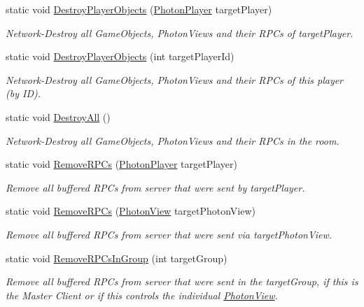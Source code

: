 \begin{DoxyCompactItemize}
static void \hyperlink{class_photon_network_a4c8c84b764c759a16296a1f3ebe48c46}{Destroy\+Player\+Objects} (\hyperlink{class_photon_player}{Photon\+Player} target\+Player)
\begin{DoxyCompactList}\small\item\em Network-\/\+Destroy all Game\+Objects, Photon\+Views and their R\+P\+Cs of target\+Player. \end{DoxyCompactList}\item 
static void \hyperlink{class_photon_network_aa3e39af39baae3611730b914a8fe6f8b}{Destroy\+Player\+Objects} (int target\+Player\+Id)
\begin{DoxyCompactList}\small\item\em Network-\/\+Destroy all Game\+Objects, Photon\+Views and their R\+P\+Cs of this player (by ID). \end{DoxyCompactList}\item 
static void \hyperlink{class_photon_network_a3b52beccf64860705cc467d7abf9fc41}{Destroy\+All} ()
\begin{DoxyCompactList}\small\item\em Network-\/\+Destroy all Game\+Objects, Photon\+Views and their R\+P\+Cs in the room. \end{DoxyCompactList}\item 
static void \hyperlink{class_photon_network_a0b99a01696f62ff29e005e6f939f8dc4}{Remove\+R\+P\+Cs} (\hyperlink{class_photon_player}{Photon\+Player} target\+Player)
\begin{DoxyCompactList}\small\item\em Remove all buffered R\+P\+Cs from server that were sent by target\+Player. \end{DoxyCompactList}\item 
static void \hyperlink{class_photon_network_a808fc6d1770c999fb1f5716abb45451a}{Remove\+R\+P\+Cs} (\hyperlink{class_photon_view}{Photon\+View} target\+Photon\+View)
\begin{DoxyCompactList}\small\item\em Remove all buffered R\+P\+Cs from server that were sent via target\+Photon\+View. \end{DoxyCompactList}\item 
static void \hyperlink{class_photon_network_ae6fd306fd4adf0c44d64d9cfadc038aa}{Remove\+R\+P\+Cs\+In\+Group} (int target\+Group)
\begin{DoxyCompactList}\small\item\em Remove all buffered R\+P\+Cs from server that were sent in the target\+Group, if this is the Master Client or if this controls the individual \hyperlink{class_photon_view}{Photon\+View}. \end{DoxyCompactList}\item 

\end{DoxyCompactItemize}
